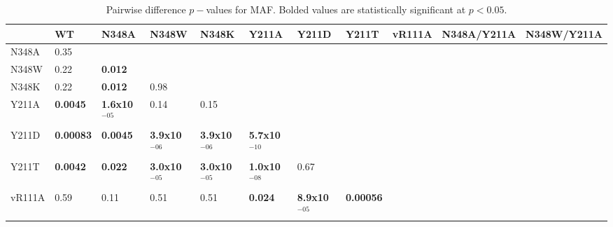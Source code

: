 \documentclass[12pt]{article}
\begin{document}
\clearpage
\begin {table}[H]
\caption{\label{tab:MAF_p}Pairwise difference $p-$values for MAF. Bolded values are statistically significant at $p<0.05$.}
\begin{center}
  \resizebox{16cm}{!} {
    \begin{tabular}{l l l l l l l l l l l}
    \hline
                & WT                      & N348A                   & N348W                   & N348K                   & Y211A                   & Y211D                     & Y211T                   & vR111A                  & N348A/Y211A             & N348W/Y211A \\ \hline
    N348A       & 0.35                    &                         &                         &                         &                         &                           &                         &                         &                         &        \\
    N348W       & 0.22                    & \textbf{0.012}          &                         &                         &                         &                           &                         &                         &                         &        \\
    N348K       & 0.22                    & \textbf{0.012}          & 0.98                    &                         &                         &                           &                         &                         &                         &        \\
    Y211A       & \textbf{0.0045}         & \textbf{1.6x10$^{-05}$} & 0.14                    & 0.15                    &                         &                           &                         &                         &                         &        \\
    Y211D       & \textbf{0.00083}        & \textbf{0.0045}         & \textbf{3.9x10$^{-06}$} & \textbf{3.9x10$^{-06}$} & \textbf{5.7x10$^{-10}$} &                           &                         &                         &                         &        \\
    Y211T       & \textbf{0.0042}         & \textbf{0.022}          & \textbf{3.0x10$^{-05}$} & \textbf{3.0x10$^{-05}$} & \textbf{1.0x10$^{-08}$} & 0.67                      &                         &                         &                         &        \\
   vR111A       & 0.59                    & 0.11                    & 0.51                    & 0.51                    & \textbf{0.024}          & \textbf{8.9x10$^{-05}$}   & \textbf{0.00056}        &                         &                         &        \\

\end{tabular}}
\end{center}
\end{table}
\end{document}

